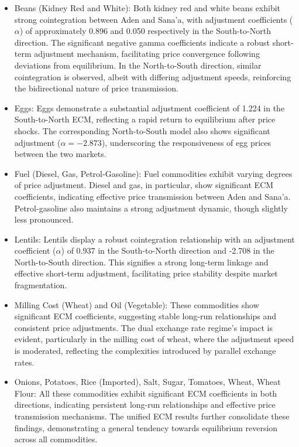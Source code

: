 \begin{itemize}
\item Beans (Kidney Red and White): Both kidney red and white beans exhibit strong cointegration between Aden and Sana'a, with adjustment coefficients ($\alpha$) of approximately 0.896 and 0.050 respectively in the South-to-North direction. The significant negative gamma coefficients indicate a robust short-term adjustment mechanism, facilitating price convergence following deviations from equilibrium. In the North-to-South direction, similar cointegration is observed, albeit with differing adjustment speeds, reinforcing the bidirectional nature of price transmission.

\item Eggs: Eggs demonstrate a substantial adjustment coefficient of 1.224 in the South-to-North ECM, reflecting a rapid return to equilibrium after price shocks. The corresponding North-to-South model also shows significant adjustment ($\alpha = -2.873$), underscoring the responsiveness of egg prices between the two markets.

\item Fuel (Diesel, Gas, Petrol-Gasoline): Fuel commodities exhibit varying degrees of price adjustment. Diesel and gas, in particular, show significant ECM coefficients, indicating effective price transmission between Aden and Sana'a. Petrol-gasoline also maintains a strong adjustment dynamic, though slightly less pronounced.

\item Lentils: Lentils display a robust cointegration relationship with an adjustment coefficient ($\alpha$) of 0.937 in the South-to-North direction and -2.708 in the North-to-South direction. This signifies a strong long-term linkage and effective short-term adjustment, facilitating price stability despite market fragmentation.

\item Milling Cost (Wheat) and Oil (Vegetable): These commodities show significant ECM coefficients, suggesting stable long-run relationships and consistent price adjustments. The dual exchange rate regime's impact is evident, particularly in the milling cost of wheat, where the adjustment speed is moderated, reflecting the complexities introduced by parallel exchange rates.

\item Onions, Potatoes, Rice (Imported), Salt, Sugar, Tomatoes, Wheat, Wheat Flour: All these commodities exhibit significant ECM coefficients in both directions, indicating persistent long-run relationships and effective price transmission mechanisms. The unified ECM results further consolidate these findings, demonstrating a general tendency towards equilibrium reversion across all commodities.
\end{itemize}


